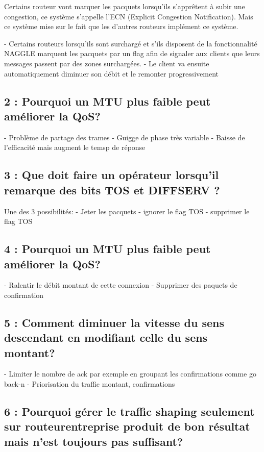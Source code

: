 \documentclass{article}
\begin{document}
Certains routeur vont marquer les pacquets lorsqu'ils s'apprêtent à subir une congestion, ce système s'appelle l'ECN (Explicit Congestion Notification). Mais ce système mise sur le fait que les d'autres routeurs implément ce système. 

- Certains routeurs lorsqu'ils sont surchargé et s'ils disposent de la fonctionnalité NAGGLE marquent les pacquets par un flag afin de signaler aux clients que leurs messages passent par des zones surchargées.
- Le client va ensuite automatiquement diminuer son débit et le remonter progressivement

\subsection{2 : Pourquoi un MTU plus faible peut améliorer la QoS?}

- Problème de partage des trames
- Guigge de phase très variable
- Baisse de l'efficacité mais augment le temsp de réponse

\subsection{3 : Que doit faire un opérateur lorsqu'il remarque des bits TOS et DIFFSERV ?}

Une des 3 possibilités:
- Jeter les pacquets
- ignorer le flag TOS
- supprimer le flag TOS

\subsection{4 : Pourquoi un MTU plus faible peut améliorer la QoS?}

- Ralentir le débit montant de cette connexion
- Supprimer des paquets de confirmation


\subsection{5 : Comment diminuer la vitesse du sens descendant en modifiant celle du sens montant?}

- Limiter le nombre de ack par exemple en groupant les confirmations comme go back-n
- Priorisation du traffic montant, confirmations


\subsection{6 : Pourquoi gérer le traffic shaping seulement sur routeurentreprise produit de bon résultat mais n'est toujours pas suffisant?}
\end{document}
